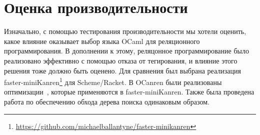

\section{Оценка производительности}
\label{sec:evaluation}

Изначально, с помощью тестирования производительности мы хотели оценить, какое влияние оказывает выбор языка OCaml для реляционного программирования.
В дополнении к этому, реляцонное программирование было реализовано эффективно с помощью отказа от тегирования, и влияние этого решения тоже должно быть оценено.
Для сравнения был выбрана реализация faster-miniKanren\footnote{\url{https://github.com/michaelballantyne/faster-minikanren}} для Scheme/Racket.
В OCanren были реализованы
оптимизации~\cite{WillThesis},%
которые применяются в faster-miniKanren.
Также была проведена работа по обеспечению обхода дерева поиска одинаковым образом.
%

